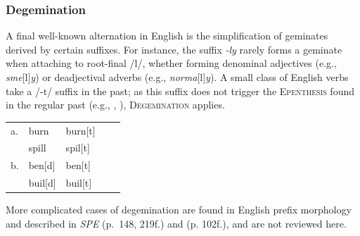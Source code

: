
\subsubsection{Degemination}

A final well-known alternation in English is the simplification of geminates derived by certain suffixes. For instance, the suffix \emph{-ly} rarely forms a geminate when attaching to root-final /l/, whether forming denominal adjectives (e.g., \emph{sme}[l]\emph{y}) or deadjectival adverbs (e.g., \emph{norma}[l]\emph{y}). A small class of English verbs take a /-t/ suffix in the past; as this suffix does not trigger the \textsc{Epenthesis} found in the regular past (e.g., \citealt{Bakovic2005b}, \citealt{Fruehwald2011}), \textsc{Degemination} applies.

\begin{example}
\begin{tabular}{l l l l l}
a. & burn    & burn[t] \\
   & spill   & spil[t] \\
b. & ben[d]  & ben[t]  \\
   & buil[d] & buil[t] \\
\end{tabular}
\end{example}

More complicated cases of degemination are found in English prefix morphology and described in \emph{SPE} (p.~148, 219f.) and \citealt[][]{Borowsky1986} (p. 102f.), and are not reviewed here.


